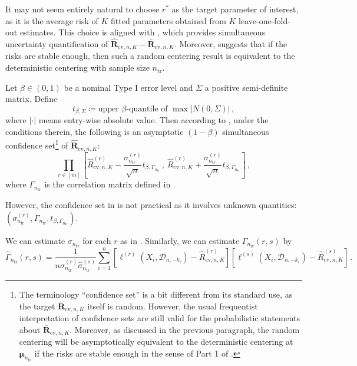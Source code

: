 \documentclass[11pt]{article}
\theoremstyle{plain}
\newcommand{\cv}{{\mathrm{cv}}}
\newcommand{\tr}{{\mathrm{tr}}}
\newcommand{\D}{{\mathcal{D}}}
\begin{document}
It may not seem entirely natural to choose $r^*$ as the target parameter of interest, as it is the average risk of $K$ fitted parameters obtained from $K$ leave-one-fold-out estimates. This choice is aligned with , which provides simultaneous uncertainty quantification of $\hat{\mathbf R}_{\cv,n,K}-\bar{\mathbf R}_{\cv,n,K}$.  Moreover,  suggests that if the risks are stable enough, then such a random centering result is equivalent to the deterministic centering with sample size $n_\tr$.

Let $\beta\in(0,1)$ be a nominal Type I error level and $\Sigma$ a positive semi-definite matrix. Define 
\begin{equation}\label{eq:5.1-gaussian-quantile-abs}
t_{\beta,\Sigma} \coloneqq \text{upper }\beta\text{-quantile of } \max|N(0,\Sigma)|\,,\end{equation}
where $|\cdot|$ means entry-wise absolute value.
Then according to , under the conditions therein, the following is an asymptotic $(1-\beta)$ simultaneous confidence set\footnote{The  terminology ``confidence set'' is a bit different from its standard use, as the target $\bar{\mathbf R}_{\cv,n,K}$ itself is random. However, the usual frequentist interpretation of confidence sets are still valid for the probabilistic statements about $\bar{\mathbf R}_{\cv,n,K}$. Moreover, as discussed in the previous paragraph, the random centering will be asymptotically equivalent to the deterministic centering at $\boldsymbol{\mu}_{n_\tr}$ if the risks are stable enough in the sense of Part 1 of .} of $\hat{\mathbf R}_{\cv,n,K}$:
\begin{equation}
    \label{eq:5.1-simu-cs-ideal}
    \prod_{r\in[m]} \left[\hat R^{(r)}_{\cv,n,K}-\frac{\sigma_{n_\tr}^{(r)}}{\sqrt{n}}t_{\beta,\Gamma_{n_\tr}}\,,~\hat R^{(r)}_{\cv,n,K}+\frac{\sigma_{n_\tr}^{(r)}}{\sqrt{n}}t_{\beta,\Gamma_{n_\tr}}\right]\,,
\end{equation}
where $\Gamma_{n_\tr}$ is the correlation matrix defined in .

However, the confidence set in  is not practical as it involves unknown quantities: $(\sigma_{n_\tr}^{(r)},\Gamma_{n_\tr},t_{\beta,\Gamma_{n_{\tr}}})$.

We can estimate $\sigma_{n_\tr}$ for each $r$ as in . Similarly, we can estimate $\Gamma_{n_\tr}(r,s)$ by
\begin{equation}\label{eq:5.1-gamma-hat}
\hat\Gamma_{n_\tr}(r,s)=\frac{1}{n \hat\sigma_{n_\tr}^{(r)}\hat\sigma_{n_\tr}^{(s)}}\sum_{i=1}^n[\ell^{(r)}(X_i,\D_{n,-k_i})-\hat R_{\cv,n,K}^{(r)}][\ell^{(s)}(X_i,\D_{n,-k_i})-\hat R_{\cv,n,K}^{(s)}]\,.
\end{equation}
\end{document}
